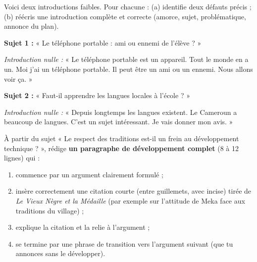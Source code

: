 \documentclass[11pt]{article}
\newcounter{popsec}
\newcounter{popsub}
\newcommand{\courssub}[1]{%
  \stepcounter{popsub}%
  \par\vspace{9pt}\noindent{\popxbold\fontsize{11.5}{13}\selectfont\color{popink}{\color{poporange}\thepopsec.\thepopsub}\hspace{6pt}#1}\par\nopagebreak\vspace{4pt}
}
\begin{document}
\courssub{Je m'entraîne}

\begin{exercice}
Voici deux introductions faibles. Pour chacune : (a) identifie deux défauts précis ; (b) réécris une introduction complète et correcte (amorce, sujet, problématique, annonce du plan).

\textbf{Sujet 1 :} « Le téléphone portable : ami ou ennemi de l'élève ? »

\emph{Introduction nulle :} « Le téléphone portable est un appareil. Tout le monde en a un. Moi j'ai un téléphone portable. Il peut être un ami ou un ennemi. Nous allons voir ça. »

\textbf{Sujet 2 :} « Faut-il apprendre les langues locales à l'école ? »

\emph{Introduction nulle :} « Depuis longtemps les langues existent. Le Cameroun a beaucoup de langues. C'est un sujet intéressant. Je vais donner mon avis. »
\end{exercice}

\begin{exercice}
À partir du sujet « Le respect des traditions est-il un frein au développement technique ? », rédige \textbf{un paragraphe de développement complet} (8 à 12 lignes) qui :
\begin{enumerate}
\item commence par un argument clairement formulé ;
\item insère correctement une citation courte (entre guillemets, avec incise) tirée de \emph{Le Vieux Nègre et la Médaille} (par exemple sur l'attitude de Meka face aux traditions du village) ;
\item explique la citation et la relie à l'argument ;
\item se termine par une phrase de transition vers l'argument suivant (que tu annonces sans le développer).
\end{enumerate}
\end{exercice}
\end{document}
